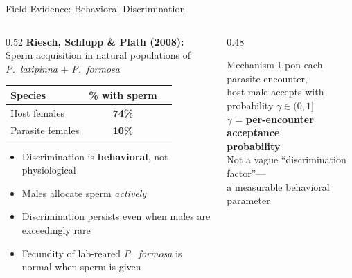 \documentclass{beamer}
\begin{document}
\begin{frame}{Field Evidence: Behavioral Discrimination}

  \footnotesize

  \begin{columns}[T]
    \begin{column}{0.52\textwidth}
      \textbf{Riesch, Schlupp \& Plath (2008):}\\
      Sperm acquisition in natural populations
      of \textit{P.~latipinna} + \textit{P.~formosa}

      \vspace{0.3cm}
      \begin{tabular}{lcc}
        \toprule
        Species & \% with sperm \\
        \midrule
        Host females & \textbf{74\%} \\
        Parasite females & \textbf{10\%} \\
        \bottomrule
      \end{tabular}

      \vspace{0.4cm}
      \begin{itemize}
        \item Discrimination is \textbf{behavioral}, not physiological
        \item Males allocate sperm \emph{actively}
        \item Discrimination persists even when males are exceedingly rare
        \item Fecundity of lab-reared \textit{P.~formosa} is normal when sperm is given
      \end{itemize}
    \end{column}

    \begin{column}{0.48\textwidth}
      \vspace{0.1cm}
      \begin{block}{Mechanism}
        Upon each parasite encounter, \\
        host male accepts with probability
        $\gamma \in (0,1]$\\[6pt]
        $\gamma$ = \textbf{per-encounter acceptance\\
        probability}\\[6pt]
        Not a vague ``discrimination factor''---\\
        a measurable behavioral parameter
      \end{block}


\end{column}
\end{columns}
\end{frame}
\end{document}
